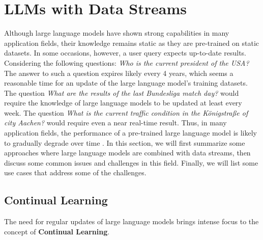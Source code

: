 \documentclass[runningheads]{llncs}
\begin{document}
\section{LLMs with Data Streams}
Although large language models have shown strong capabilities in many application fields, their knowledge remains static as they are pre-trained on static datasets. In some occasions, however, a user query
expects up-to-date results. Considering the following questions: \textit{Who is the current president of the USA?} The answer to such a question expires likely every 4 years, which seems a reasonable time
for an update of the large language model's training datasets. The question \textit{What are the results of the last Bundesliga match day?} would require the knowledge of large language models to be updated
at least every week. The question \textit{What is the current traffic condition in the Königstraße of city Aachen?} would require even a near real-time result. Thus, in many application fields, the performance of a 
pre-trained large language model is likely to gradually degrade over time \cite{Shi24}. In this section, we will first summarize some approaches where large language models are combined with data streams, then discuss some common issues and challenges in this field.
Finally, we will list some use cases that address some of the challenges.

\subsection{Continual Learning}
The need for regular updates of large language models brings intense focus to the concept of \textbf{Continual Learning}.  
\end{document}
